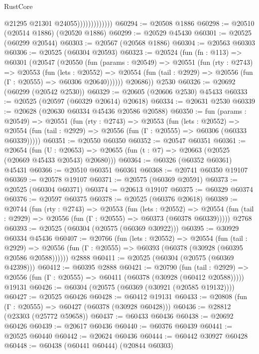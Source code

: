 \begin{lexlean}{RustCore}
\begin{coremodule}
                              @21295
                              @21301
                              @24055)))))))))))))
@60294 := @20508 @1886
@60298 := @20510 (@20514 @1886) (@20520 @1886)
@60299 := @20529 @45430
@60301 := @20525 (@60299 @20544)
@60303 := @20567 (@20568 @1886)
@60304 := @20563 @60303
@60306 := @20525 (@60304 @20593)
@60323 := @20524
    (fun (fn : @113) =>
    @60301
      (@20547
        (@20550
          (fun (params : @20549) =>
          @20551
            (fun (rty : @2743) =>
            @20553
              (fun (lets : @20552) =>
              @20554 (fun (tail : @2929) => @20556 (fun (Γ : @20555) => @60306 @20640))))))
        @20686))
    @2530
@60326 := @20692 (@60299 (@20542 @2530))
@60329 := @20605 (@20606 @2530) @45433
@60333 := @20525 (@20597 (@60329 @20614) @20618)
@60334 := @20631 @2530
@60339 := @20628 (@20630 @60334 @45436 @20586 @20588)
@60350 := fun (params : @20549) =>
  @20551
    (fun (rty : @2743) =>
    @20553
      (fun (lets : @20552) =>
      @20554 (fun (tail : @2929) => @20556 (fun (Γ : @20555) => @60306 (@60333 @60339)))))
@60351 := @20550 @60350
@60352 := @20547 @60351
@60361 := @20654
    (fun (U : @20653) => @20655 (fun (t : @7) => @20663 (@20525 (@20669 @45433 @20543) @20680)))
@60364 := @60326 (@60352 @60361) @45431
@60366 := @20510 @60351 @60361
@60368 := @20741 @60350 @19107
@60369 := @20578 @19107
@60371 := @20575 (@60369 @20591)
@60373 := @20525 (@60304 @60371)
@60374 := @20613 @19107
@60375 := @60329 @60374
@60376 := @20597 @60375
@60378 := @20525 (@60376 @20618)
@60389 := @20744
    (fun (rty : @2743) =>
    @20553
      (fun (lets : @20552) =>
      @20554 (fun (tail : @2929) => @20556 (fun (Γ : @20555) => @60373 (@60378 @60339)))))
    @2768
@60393 := @20525 (@60304 (@20575 (@60369 @30922)))
@60395 := @30929 @60334 @45436
@60407 := @20766
    (fun (lets : @20552) =>
    @20554
      (fun (tail : @2929) =>
      @20556 (fun (Γ : @20555) => @60393 (@60378 (@30928 (@60395 @20586 @20588))))))
    @2888
@60411 := @20525 (@60304 (@20575 (@60369 @42398)))
@60412 := @60395 @2888
@60421 := @20790
    (fun (tail : @2929) => @20556 (fun (Γ : @20555) => @60411 (@60378 (@30928 (@60412 @20588)))))
    @19131
@60426 := @60304 (@20575 (@60369 (@30921 (@20585 @19132))))
@60427 := @20525 @60426
@60428 := @60412 @19131
@60433 := @20808 (fun (Γ : @20555) => @60427 (@60378 (@30928 @60428)))
@60436 := @28812 (@23303 (@25772 @59658))
@60437 := @60433 @60436
@60438 := @20692 @60426
@60439 := @20617 @60436
@60440 := @60376 @60439
@60441 := @20525 @60440
@60442 := @20624 @60436
@60444 := @60442 @30927 @60428
@60448 := @60438 (@60441 @60444) (@20844 @60303)

\end{coremodule}
\end{lexlean}

